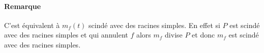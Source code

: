 \documentclass{mybourbaki}
\begin{document}
\paragraph{Remarque}C'est équivalent à $m_f(t)$ scindé avec des racines simples. En effet si $P$ est scindé avec des racines simples et qui annulent $f$ alors $m_f$ divise $P$ et donc $m_f$ est scindé avec des racines simples.
\end{document}
